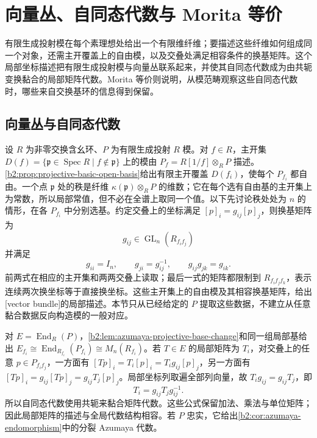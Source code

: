 

\section{向量丛、自同态代数与 Morita 等价}
\label{b2:sec:C04}

有限生成投射模在每个素理想处给出一个有限维纤维；要描述这些纤维如何组成同一个对象，还需主开覆盖上的自由模，以及交叠处满足相容条件的换基矩阵。这个局部坐标描述把有限生成投射模与向量丛联系起来，并使其自同态代数成为由共轭变换黏合的局部矩阵代数。Morita 等价则说明，从模范畴观察这些自同态代数时，哪些来自交换基环的信息得到保留。

\subsection{向量丛与自同态代数}
\label{b2:subsec:C04:01}

设 \(R\) 为非零交换含幺环、\(P\) 为有限生成投射 \(R\) 模。对 \(f\in R\)，主开集 \(D(f)=\{\mathfrak p\in\operatorname{Spec}R\mid f\notin\mathfrak p\}\) 上的模由 \(P_f=R[1/f]\otimes_RP\) 描述。\cref{b2:prop:projective-basic-open-basis}给出有限主开覆盖 \(D(f_i)\)，使每个 \(P_{f_i}\) 都自由。一个点 \(\mathfrak p\) 处的秩是纤维 \(\kappa(\mathfrak p)\otimes_RP\) 的维数；它在每个选有自由基的主开集上为常数，所以局部常值，但不必在全谱上取同一个值。以下先讨论秩处处为 \(n\) 的情形，在各 \(P_{f_i}\) 中分别选基。约定交叠上的坐标满足 \([p]_i=g_{ij}[p]_j\)，则换基矩阵为
\[
	g_{ij}\in\operatorname{GL}_n(R_{f_if_j})
\]
并满足
\[
	g_{ii}=I_n,\qquad g_{ji}=g_{ij}^{-1},\qquad g_{ij}g_{jk}=g_{ik}.
\]
前两式在相应的主开集和两两交叠上读取；最后一式的矩阵都限制到 \(R_{f_if_jf_k}\)，表示连续两次换坐标等于直接换坐标。这些主开集上的自由模及其相容换基矩阵，给出[vector bundle]的局部描述。本节只从已经给定的 \(P\) 提取这些数据，不建立从任意黏合数据反向构造模的一般对应。

\ProseParagraphBreak
对 \(E=\operatorname{End}_R(P)\)，\cref{b2:lem:azumaya-projective-base-change}和同一组局部基给出 \(E_{f_i}\cong\operatorname{End}_{R_{f_i}}(P_{f_i})\cong M_n(R_{f_i})\)。若 \(T\in E\) 的局部矩阵为 \(T_i\)，对交叠上的任意 \(p\in P_{f_if_j}\)，一方面有 \([Tp]_i=T_i[p]_i=T_ig_{ij}[p]_j\)，另一方面有 \([Tp]_i=g_{ij}[Tp]_j=g_{ij}T_j[p]_j\)。局部坐标列取遍全部列向量，故 \(T_ig_{ij}=g_{ij}T_j\)，即
\begin{equation}\label{b2:eq:endomorphism-bundle-transition}
	T_i=g_{ij}T_jg_{ij}^{-1}.
\end{equation}
所以自同态代数使用共轭来黏合矩阵代数。这些公式保留加法、乘法与单位矩阵；因此局部矩阵的描述与全局代数结构相容。若 \(P\) 忠实，它给出\cref{b2:cor:azumaya-endomorphism}中的分裂 Azumaya 代数。

